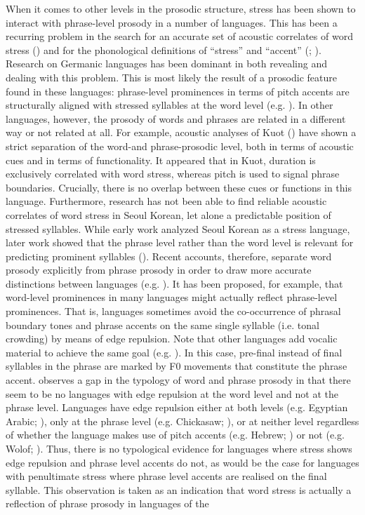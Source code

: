 When it comes to other levels in the prosodic structure, stress has been shown to interact with phrase-level prosody in a number of languages. This has been a recurring problem in the search for an accurate set of acoustic correlates of word stress (\citealt{roettger_methodological_2017}) and for the phonological definitions of ``stress'' and ``accent'' (\citealt{beckman_stress_1986}; \citealt{hyman_word-prosodic_2006}). Research on Germanic languages has been dominant in both revealing and dealing with this problem. This is most likely the result of a prosodic feature found in these languages: phrase-level prominences in terms of pitch accents are structurally aligned with stressed syllables at the word level (e.g. \citealt{ladd_intonational_2008}). In other languages, however, the prosody of words and phrases are related in a different way or not related at all. For example, acoustic analyses of Kuot (\citealt{lindstrom_aspects_2005}) have shown a strict separation of the word-and phrase-prosodic level, both in terms of acoustic cues and in terms of functionality. It appeared that in Kuot, duration is exclusively correlated with word stress, whereas pitch is used to signal phrase boundaries. Crucially, there is no overlap between these cues or functions in this language. Furthermore, research has not been able to find reliable acoustic correlates of word stress in Seoul Korean, let alone a predictable position of stressed syllables. While early work analyzed Seoul Korean as a stress language, later work showed that the phrase level rather than the word level is relevant for predicting prominent syllables (\citealt{jun_phonetics_1996}). Recent accounts, therefore, separate word prosody explicitly from phrase prosody in order to draw more accurate distinctions between languages (e.g. \citealt{gordon_disentangling_2014}). It has been proposed, for example, that word-level prominences in many languages might actually reflect phrase-level prominences. That is, languages sometimes avoid the co-occurrence of phrasal boundary tones and phrase accents on the same single syllable (i.e. tonal crowding) by means of edge repulsion. Note that other languages add vocalic material to achieve the same goal (e.g. \citealt{grice_word_2018}). In this case, pre-final instead of final syllables in the phrase are marked by F0 movements that constitute the phrase accent. \citet{gordon_disentangling_2014} observes a gap in the typology of word and phrase prosody in that there seem to be no languages with edge repulsion at the word level and not at the phrase level. Languages have edge repulsion either at both levels (e.g. Egyptian Arabic; \citealt{hellmuth_relationship_2007}), only at the phrase level (e.g. Chickasaw; \citealt{gordon_intonational_2005}), or at neither level regardless of whether the language makes use of pitch accents (e.g. Hebrew; \citealt{becker_hebrew_2003}) or not (e.g. Wolof; \citealt{rialland_intonational_2001}). Thus, there is no typological evidence for languages where stress shows edge repulsion and phrase level accents do not, as would be the case for languages with penultimate stress where phrase level accents are realised on the final syllable. This observation is taken as an indication that word stress is actually a reflection of phrase prosody in languages of the 